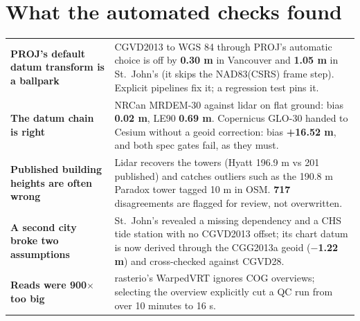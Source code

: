 \documentclass[10pt,letterpaper]{article}
\newcommand{\num}[1]{{\color{teal}\textbf{#1}}}
\begin{document}
\section{What the automated checks found}
\begin{tabularx}{\textwidth}{@{}>{\raggedright\arraybackslash}p{}X@{}}
\textbf{PROJ's default datum transform is a ballpark} & CGVD2013 to WGS 84 through PROJ's automatic choice is off by \num{0.30 m} in Vancouver and \num{1.05 m} in St.\ John's (it skips the NAD83(CSRS) frame step). Explicit pipelines fix it; a regression test pins it.\\[3pt]
\textbf{The datum chain is right} & NRCan MRDEM-30 against lidar on flat ground: bias \num{0.02 m}, LE90 \num{0.69 m}. Copernicus GLO-30 handed to Cesium without a geoid correction: bias \num{+16.52 m}, and both spec gates fail, as they must.\\[3pt]
\textbf{Published building heights are often wrong} & Lidar recovers the towers (Hyatt 196.9 m vs 201 published) and catches outliers such as the 190.8 m Paradox tower tagged 10 m in OSM. \num{717} disagreements are flagged for review, not overwritten.\\[3pt]
\textbf{A second city broke two assumptions} & St.\ John's revealed a missing dependency and a CHS tide station with no CGVD2013 offset; its chart datum is now derived through the CGG2013a geoid (\num{$-$1.22 m}) and cross-checked against CGVD28.\\[3pt]
\textbf{Reads were 900$\times$ too big} & rasterio's WarpedVRT ignores COG overviews; selecting the overview explicitly cut a QC run from over 10 minutes to 16 s.\\
\end{tabularx}
\end{document}
